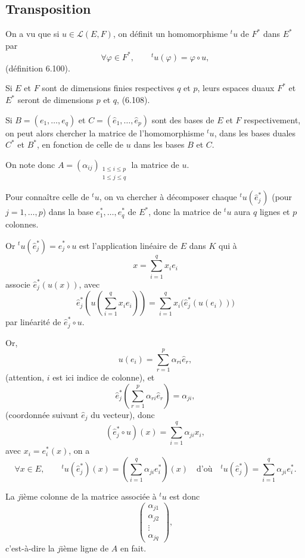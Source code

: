 \subsection*{Transposition}

On a vu que si $u\in\mathcal L(E,F)$, on définit un homomorphisme ${}^tu$ de $F^*$ dans $E^*$ par
\[
\forall\varphi\in F^*,\qquad {}^tu(\varphi)=\varphi\circ u,
\]
(définition 6.100).

Si $E$ et $F$ sont de dimensions finies respectives $q$ et $p$, leurs espaces duaux $F^*$ et $E^*$ seront de dimensions $p$ et $q$, (6.108).

Si $B=(e_1,\ldots,e_q)$ et $C=(\hat e_1,\ldots,\hat e_p)$ sont des bases de $E$ et $F$ respectivement, on peut alors chercher la matrice de l'homomorphisme ${}^tu$, dans les bases duales $C^*$ et $B^*$, en fonction de celle de $u$ dans les bases $B$ et $C$.

On note donc $A=(\alpha_{ij})_{\substack{1\le i\le p\\1\le j\le q}}$ la matrice de $u$.

Pour connaître celle de ${}^tu$, on va chercher à décomposer chaque ${}^tu(\hat e_j^*)$ (pour $j=1,\ldots,p$) dans la base $e_1^*,\ldots,e_q^*$ de $E^*$, donc la matrice de ${}^tu$ aura $q$ lignes et $p$ colonnes.

Or ${}^tu(\hat e_j^*)=\hat e_j^*\circ u$ est l'application linéaire de $E$ dans $K$ qui à
\[
x=\sum_{i=1}^q x_ie_i
\]
associe $\hat e_j^*(u(x))$, avec
\[
\hat e_j^*\left(u\left(\sum_{i=1}^q x_ie_i\right)\right)=\sum_{i=1}^q x_i\bigl(\hat e_j^*(u(e_i))\bigr)
\]
par linéarité de $\hat e_j^*\circ u$.

Or,
\[
u(e_i)=\sum_{r=1}^p\alpha_{ri}\hat e_r,
\]
(attention, $i$ est ici indice de colonne), et
\[
\hat e_j^*\left(\sum_{r=1}^p\alpha_{ri}\hat e_r\right)=\alpha_{ji},
\]
(coordonnée suivant $\hat e_j$ du vecteur), donc
\[
(\hat e_j^*\circ u)(x)=\sum_{i=1}^q\alpha_{ji}x_i,
\]
avec $x_i=e_i^*(x)$, on a
\[
\tag{8.7}
\forall x\in E,\qquad {}^tu(\hat e_j^*)(x)=\left(\sum_{i=1}^q\alpha_{ji}e_i^*\right)(x)
\quad\text{d'où}\quad
{}^tu(\hat e_j^*)=\sum_{i=1}^q\alpha_{ji}e_i^*.
\]

La $j$ième colonne de la matrice associée à ${}^tu$ est donc
\[
\begin{pmatrix}\alpha_{j1}\\\alpha_{j2}\\\vdots\\\alpha_{jq}\end{pmatrix},
\]
c'est-à-dire la $j$ième ligne de $A$ en fait.

